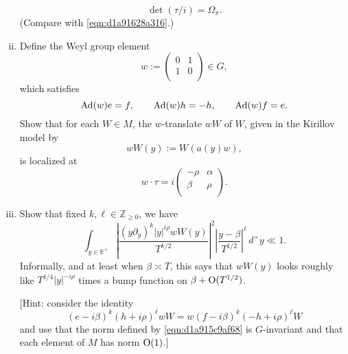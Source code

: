 \documentclass[reqno]{amsart} 
\numberwithin{equation}{section}
\begin{document}
\begin{exercise}
\begin{enumerate}[(i)]
\begin{equation*}
      \det (\tau/i) = \Omega_\pi.
    \end{equation*}
    (Compare with \eqref{eqn:d1a91628a316}.)
  \item Define the Weyl group element
    \begin{equation*}
      w :=
      \begin{pmatrix}
        0 & 1 \\
        1 & 0 \\
      \end{pmatrix}
      \in G,
    \end{equation*}
    which satisfies
    \begin{equation*}
      \operatorname{Ad}(w) e = f, \qquad
      \operatorname{Ad}(w) h = -h,
      \qquad
      \operatorname{Ad}(w) f = e.
    \end{equation*}
    Show that for each $W \in M$, the $w$-translate $w W$ of $W$, given in the Kirillov model by
    \begin{equation}\label{eqn:d1aa0102b8bb}
      w W(y) := W(a(y) w),
    \end{equation}
    is localized at
    \begin{equation*}
      w \cdot \tau = i
      \begin{pmatrix}
        -\rho  & \alpha  \\
        \beta  & \rho \\
      \end{pmatrix}.
    \end{equation*}
  \item Show that fixed $k, \ell  \in \mathbb{Z}_{\geq 0}$, we have
\begin{equation*}
  \int_{y \in \mathbb{R}^\times }
  \left\lvert \frac{(y \partial_y)^k |y|^{i \rho} w W (y)}{T^{k/2}}  \right\rvert^2
  \left\lvert \frac{y - \beta }{ T^{1/2} } \right\rvert^{\ell} \,d^\times y \ll 1.
\end{equation*}
Informally, and at least when $\beta \asymp T$, this says that $w W(y)$ looks roughly like $T^{1/4} |y|^{-i \rho}$ times a bump function on $\beta + \operatorname{O}(T^{1/2})$.

[Hint: consider the identity
    \begin{equation*}
      (e - i \beta)^k (h + i \rho)^\ell w W
      =
      w (f - i \beta)^k (-h + i \rho)^\ell W
    \end{equation*}
    and use that the norm defined by \eqref{eqn:d1a915c9af68} is $G$-invariant and that each element of $M$ has norm $\operatorname{O}(1)$.]
  \end{enumerate}
\end{exercise}
\end{document}
